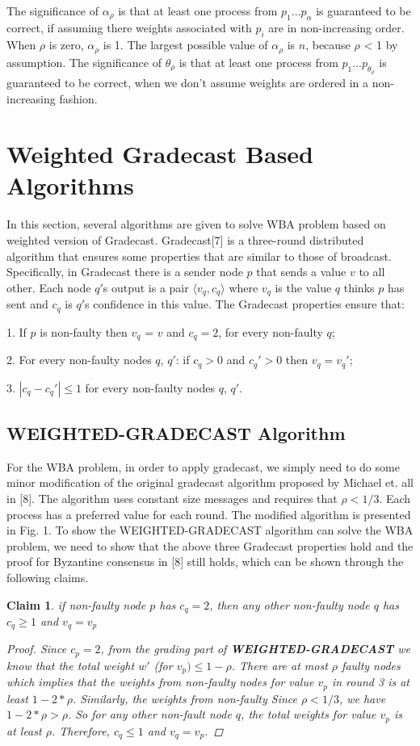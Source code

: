 \documentclass[conference]{IEEEtran}
\newtheorem{claim*}{Claim}
\begin{document}
The significance of $\alpha_\rho$ is that at least one process
from $p_1...p_\alpha$ is guaranteed to be correct, if assuming there weights associated with $p_i$ are in non-increasing order. When $\rho$ is zero, $\alpha_\rho$ is 1. The largest possible value of $\alpha_\rho$ is $n$, because $\rho$ < 1 by assumption. The significance of $\theta_\rho$ is that at least one process from $p_1...p_{\theta_{\rho}}$ is guaranteed to be correct,  when we don't assume weights are ordered in a non-increasing fashion. 

\section{Weighted Gradecast Based Algorithms}
In this section, several algorithms are given to solve WBA problem based on weighted version of Gradecast. Gradecast[7] is a three-round distributed algorithm that ensures some properties that are similar to those of broadcast. Specifically, in Gradecast there is a sender node $p$ that sends a value $v$ to all other. Each node $q'$s output is a pair $\langle v_q, c_q \rangle$ where $v_q$ is the value $q$ thinks $p$ has sent and $c_q$ is $q'$s confidence in this value. The Gradecast properties ensure that:

1. If $p$ is non-faulty then $v_q$ = $v$ and $c_q = 2$, for every non-faulty $q$;

2. For every non-faulty nodes $q$, $q'$: if $c_q > 0$ and $c_q' > 0$ then $v_q = v_q'$;

3. $|c_q - c_q'| \leq 1$ for every non-faulty nodes $q$, $q'$.


\subsection{WEIGHTED-GRADECAST Algorithm}
For the WBA problem,  in order to apply gradecast, we simply need to do some minor modification of the original gradecast algorithm proposed by Michael et. all in [8]. The algorithm uses constant size messages and requires that $\rho < 1/3$. Each process has a preferred value for each round. The modified algorithm is presented in Fig. 1. To show the WEIGHTED-GRADECAST algorithm can solve the WBA problem, we need to show that the above three Gradecast properties hold and the proof for Byzantine consensus in [8] still holds, which can be shown through the following claims.
 
\begin{claim*}
if non-faulty node $p$ has $c_q = 2$, then any other non-faulty node $q$ has $c_q \geq 1$ and $v_q = v_p$
\begin{proof}
Since $c_p = 2$, from the grading part of \textbf{WEIGHTED-GRADECAST} we know that the total weight $w'$ (for $v_p) \leq 1 - \rho$. There are at most $\rho$ faulty nodes which implies that the weights from non-faulty nodes for value $v_p$ in round 3 is at least $1 - 2*\rho$. Similarly,  the weights from non-faulty Since $\rho < 1/3$, we have $1 - 2*\rho > \rho$. So for any other non-fault node $q$, the total weights for value $v_p$ is at least $\rho$. Therefore, $c_q \leq 1$ and $v_q = v_p$.
\end{proof}
\end{claim*}
\end{document}

